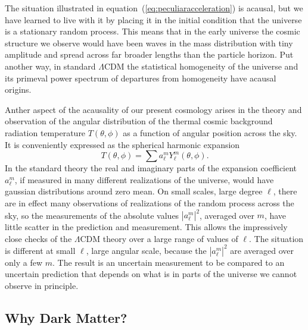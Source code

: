 \documentclass[fleqn,usenatbib]{mnras}
\newcommand{\beq}{\begin{equation}}
\newcommand{\eeq}{\end{equation}}
\begin{document}
The situation illustrated in equation~(\ref{eq:peculiaracceleration}) is acausal, but we have learned to live with it by placing it in the initial condition that the universe is a stationary random process. This means that in the early universe the cosmic structure we observe would have been waves in the mass distribution with tiny amplitude and spread across far broader lengths than the particle horizon. Put another way, in standard $\Lambda$CDM the statistical homogeneity of the universe and its primeval power spectrum of departures from homogeneity have acausal origins. 

Anther aspect of the acausality of our present cosmology arises in the theory and observation of the angular distribution of the thermal cosmic background radiation temperature $T(\theta, \phi)$ as a function of angular position across the sky. It is conveniently expressed as the spherical harmonic expansion 
\beq
T(\theta, \phi) = \sum a_\ell^mY_\ell^m(\theta, \phi). \label{eq:harmonicexp}
\eeq
In the standard theory the real and imaginary parts of the expansion coefficient $a_\ell^m$, if measured in many different realizations of the universe, would have gaussian distributions around zero mean. On small scales, large degree $\ell$, there are in effect many observations of realizations of the random process across the sky, so the measurements of the absolute values $|a_\ell^m|^2$, averaged over $m$, have little scatter in the prediction and  measurement. This allows the impressively close checks of the $\Lambda$CDM theory over a large range of values of $\ell$. The situation is different at small $\ell$, large angular scale, because the $|a_\ell^m|^2$ are averaged over only a few $m$. The result is an uncertain measurement to be compared to an uncertain prediction that depends on what is in parts of the universe we cannot observe in principle.

\subsection{Why Dark Matter?}\label{DM} 
\end{document}
